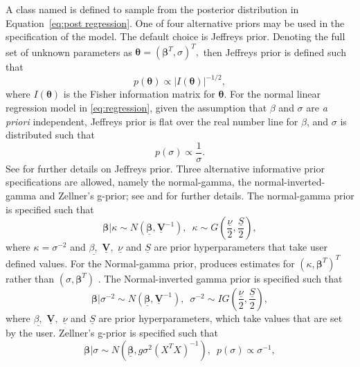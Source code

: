 \documentclass[article]{jss}
\begin{document}
A class named  is defined to sample from the
posterior distribution in Equation~\ref{eq:post regression}. One of
four alternative priors may be used in the specification of the model.
The default choice is Jeffreys prior. Denoting the full set of unknown
parameters as $\bm{\theta}=(\bm{\beta}^{T},\sigma)^{T},$ then Jeffreys
prior is defined such that
\begin{equation}
  p(\bm{\theta})\propto|I(\bm{\theta})|^{-1/2},\label{eq:Jeffrey's
    Prior}
\end{equation} 
where $I(\bm{\theta})$ is the Fisher information matrix for
$\bm{\theta}.$ For the normal linear regression model in
\ref{eq:regression}, given the assumption that $\beta$ and $\sigma$
are \emph{a priori} independent, Jeffreys prior is flat over the
real number line for $\beta$, and $\sigma$ is distributed such
that
\begin{equation}
		p\left(\sigma\right)\propto\frac{1}{\sigma}.
\end{equation}
See \cite{Zellner1971} for further details on Jeffreys prior. Three
alternative informative prior specifications are allowed, namely the
normal-gamma, the normal-inverted-gamma and Zellner's g-prior; see
\cite{Zellner1971} and \cite{MarinRobert2007} for further details.
The normal-gamma prior is specified such that
\begin{equation}
  \bm{\beta}|\kappa\sim
  N(\bm{\underline{\beta}},\underline{\bm{V}}^{-1}),\,\,\,\kappa\sim
  G\left(\frac{\underline{\nu}}{2},\frac{\underline{S}}{2}\right),\label{eq:Normal
    Gamma}
\end{equation} 
where $\kappa=\sigma^{-2}$ and $\underline{\beta,}$
$\underline{\bm{V}},$ $\underline{\nu}$ and $\underline{S}$ are prior
hyperparameters that take user defined values. For the Normal-gamma
prior,  produces estimates for\emph{
  $\left(\kappa,\bm{\beta}^{T}\right)^{T}$ }rather than
$\left(\sigma,\bm{\beta}^{T}\right)$ . The Normal-inverted gamma prior
is specified such that
\begin{equation}
  \bm{\beta}|\sigma^{-2}\sim
  N(\bm{\underline{\beta}},\underline{\bm{V}}^{-1}),\,\,\,\sigma^{-2}\sim
  IG\left(\frac{\underline{\nu}}{2},\frac{\underline{S}}{2}\right),\label{eq:Normal
    Inverted Gamma}
\end{equation} 
where $\underline{\beta,}$ $\underline{\bm{V}},$ $\underline{\nu}$ and
$\underline{S}$ are prior hyperparameters, which take values that are
set by the user. Zellner's g-prior is specified such that
\begin{equation} \bm{\beta}|\sigma\sim
  N\left(\underline{\bm{\beta}},g\sigma^{2}\left(X^{T}X\right)^{-1}\right),\,\,\,
  p(\sigma)\propto\sigma^{-1},\label{eq:g-prior}
\end{equation}
\end{document}
